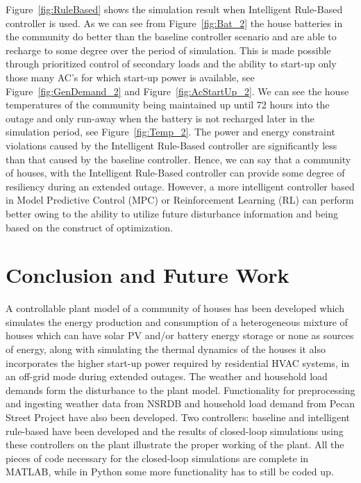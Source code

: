 \documentclass[11pt,usenames]{article}
\begin{document}
Figure~\ref{fig:RuleBased} shows the simulation result when Intelligent Rule-Based controller is used. As we can see from Figure~\ref{fig:Bat_2} the house batteries in the community do better than the baseline controller scenario and are able to recharge to some degree over the period of simulation. This is made possible through prioritized control of secondary loads and the ability to start-up only those many AC's for which start-up power is available, see Figure~\ref{fig:GenDemand_2} and Figure~\ref{fig:AcStartUp_2}. We can see the house temperatures of the community being maintained up until 72 hours into the outage and only run-away when the battery is not recharged  later in the simulation period, see Figure~\ref{fig:Temp_2}. The power and energy constraint violations caused by the Intelligent Rule-Based controller are significantly less than that caused by the baseline controller. Hence, we can say that a community of houses, with the Intelligent Rule-Based controller can provide some degree of resiliency during an extended outage. However, a more intelligent controller based in Model Predictive Control (MPC) or Reinforcement Learning (RL) can perform better owing to the ability to utilize future disturbance information and being based on the construct of optimization.

\newpage

\section{Conclusion and Future Work}\label{section:ConclusionFutureWork}
A controllable plant model of a community of houses has been developed which simulates the energy production and consumption of a heterogeneous mixture of houses which can have solar PV and/or battery energy storage or none as sources of energy, along with simulating the thermal dynamics of the houses it also incorporates the higher start-up power required by residential HVAC systems, in an off-grid mode during extended outages. The weather and household load demands form the disturbance to the plant model. Functionality for preprocessing and ingesting weather data from NSRDB and household load demand from Pecan Street Project have also been developed. Two controllers: baseline and intelligent rule-based have been developed and the results of closed-loop simulations using these controllers on the plant illustrate the proper working of the plant. All the pieces of code necessary for the closed-loop simulations are complete in MATLAB, while in Python some more functionality has to still be coded up.
\end{document}
